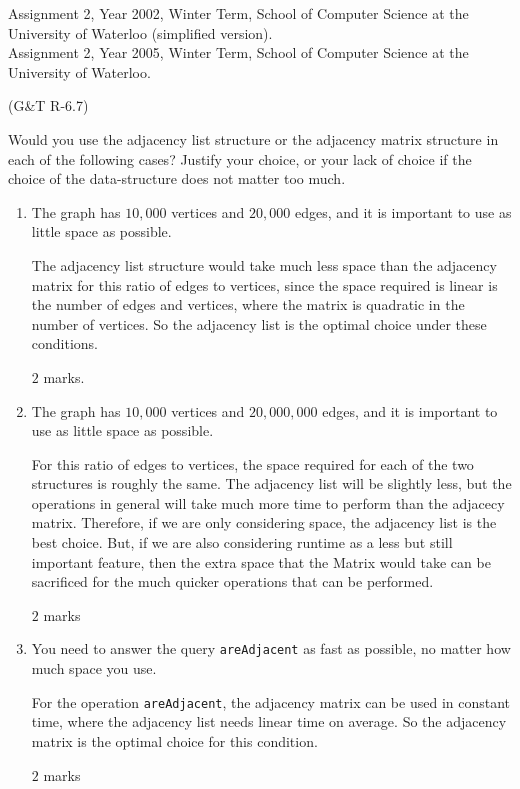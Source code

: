 \begin{usage}
Assignment 2, Year 2002, Winter Term, School of Computer Science at the University of Waterloo (simplified version).\\
Assignment 2, Year 2005, Winter Term, School of Computer Science at the University of Waterloo.
\end{usage}
\begin{authorship}
(G\&T R-6.7)  
\end{authorship}

Would you use the adjacency list structure or the adjacency matrix
structure in each of the following cases?  
%
Justify your choice, or your lack of choice if the choice of the
data-structure does not matter too much.


\begin{enumerate}

\item The graph has $10,000$ vertices and $20,000$ edges, and it is 
important to use as little space as possible.
\begin{solution}
The adjacency list structure would take much less space than the
adjacency matrix for this ratio of edges to vertices, since the space
required is linear is the number of edges and vertices, where the
matrix is quadratic in the number of vertices. So the adjacency list
is the optimal choice under these conditions.
\end{solution}
\begin{markingScheme}
$2$ marks.
\end{markingScheme}


\item The graph has $10,000$ vertices and $20,000,000$ edges, and it is
important to use as little space as possible.
\begin{solution}
For this ratio of edges to vertices, the space required for each of
the two structures is roughly the same. 
%
The adjacency list will be slightly less, but the operations in
general will take much more time to perform than the adjacecy
matrix. 
%
Therefore, if we are only considering space, the adjacency list is the
best choice.
%
But, if we are also considering runtime as a less but still important
feature, then the extra space that the Matrix would take can be
sacrificed for the much quicker operations that can be performed.
\end{solution}
\begin{markingScheme}
$2$ marks
\end{markingScheme}

\item You need to answer the query {\tt areAdjacent} as fast as
possible, no matter how much space you use.
\begin{solution}
For the operation {\tt areAdjacent}, the adjacency matrix can be used
in constant time, where the adjacency list needs linear time on
average. 
%
So the adjacency matrix is the optimal choice for this condition.
\end{solution}
\begin{markingScheme}
$2$ marks
\end{markingScheme}

\end{enumerate}


